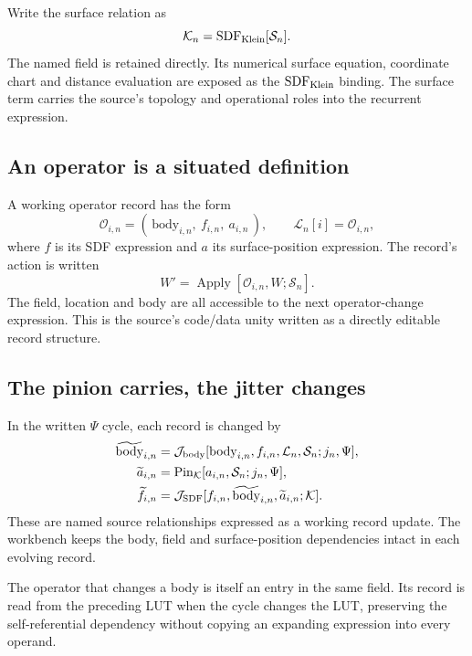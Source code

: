\documentclass[11pt,a4paper]{article}
\newcommand{\Klein}{\mathcal{K}}
\newcommand{\LUT}{\mathcal{L}}
\newcommand{\State}{\mathcal{S}}
\newcommand{\Op}{\mathcal{O}}
\newcommand{\Apply}{\operatorname{Apply}}
\newcommand{\Pin}{\operatorname{Pin}}
\begin{document}
Write the surface relation as
\begin{equation}
\Klein_n=\operatorname{SDF}_{\rm Klein}[\State_n].
\end{equation}
The named field is retained directly. Its numerical surface equation, coordinate chart and distance evaluation are exposed as the $\operatorname{SDF}_{\rm Klein}$ binding. The surface term carries the source's topology and operational roles into the recurrent expression.

\subsection{An operator is a situated definition}
A working operator record has the form
\begin{equation}
\Op_{i,n}=(\,\mathrm{body}_{i,n},\ f_{i,n},\ a_{i,n}\,),
\qquad \LUT_n[i]=\Op_{i,n},
\end{equation}
where $f$ is its SDF expression and $a$ its surface-position expression. The record's action is written
\begin{equation}
W'=\Apply[\Op_{i,n},W;\State_n].
\end{equation}
The field, location and body are all accessible to the next operator-change expression. This is the source's code/data unity written as a directly editable record structure.

\subsection{The pinion carries, the jitter changes}
In the written $\Psi$ cycle, each record is changed by
\begin{align}
\widetilde{\mathrm{body}}_{i,n}
 &=\mathcal{J}_{\rm body}
 [\mathrm{body}_{i,n},f_{i,n},\LUT_n,\State_n;j_n,\Psi],\\
\widetilde{a}_{i,n}
 &=\Pin_{\Klein}
 [a_{i,n},\State_n;j_n,\Psi],\\
\widetilde{f}_{i,n}
 &=\mathcal{J}_{\rm SDF}
 [f_{i,n},\widetilde{\mathrm{body}}_{i,n},\widetilde{a}_{i,n};\Klein].
\end{align}
These are named source relationships expressed as a working record update. The workbench keeps the body, field and surface-position dependencies intact in each evolving record.

The operator that changes a body is itself an entry in the same field. Its record is read from the preceding LUT when the cycle changes the LUT, preserving the self-referential dependency without copying an expanding expression into every operand.
\clearpage
\end{document}

